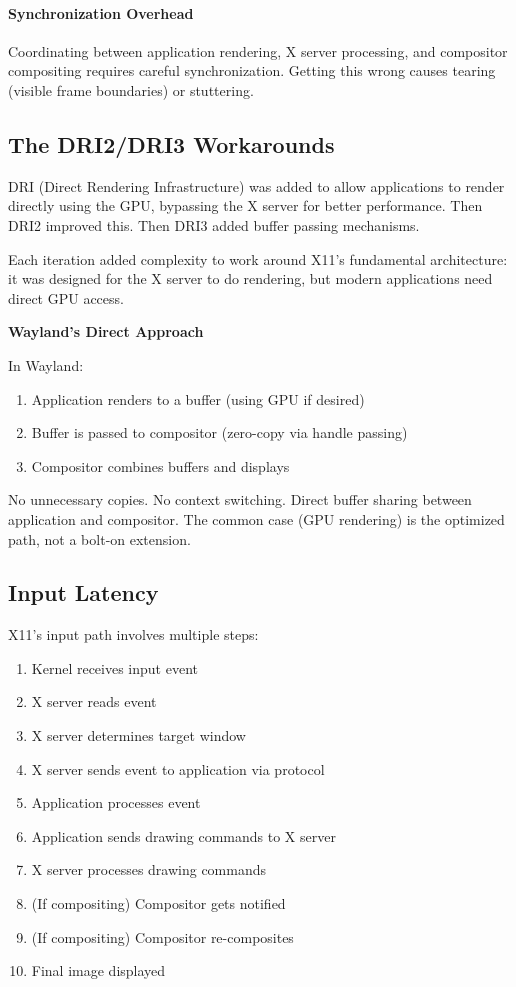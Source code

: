\paragraph{Synchronization Overhead}
Coordinating between application rendering, X server processing, and compositor compositing requires careful synchronization. Getting this wrong causes tearing (visible frame boundaries) or stuttering.

\subsection{The DRI2/DRI3 Workarounds}

DRI (Direct Rendering Infrastructure) was added to allow applications to render directly using the GPU, bypassing the X server for better performance. Then DRI2 improved this. Then DRI3 added buffer passing mechanisms.

Each iteration added complexity to work around X11's fundamental architecture: it was designed for the X server to do rendering, but modern applications need direct GPU access.

\begin{designbox}
\textbf{Wayland's Direct Approach}

In Wayland:
\begin{enumerate}
    \item Application renders to a buffer (using GPU if desired)
    \item Buffer is passed to compositor (zero-copy via handle passing)
    \item Compositor combines buffers and displays
\end{enumerate}

No unnecessary copies. No context switching. Direct buffer sharing between application and compositor. The common case (GPU rendering) is the optimized path, not a bolt-on extension.
\end{designbox}

\subsection{Input Latency}

X11's input path involves multiple steps:

\begin{enumerate}
    \item Kernel receives input event
    \item X server reads event
    \item X server determines target window
    \item X server sends event to application via protocol
    \item Application processes event
    \item Application sends drawing commands to X server
    \item X server processes drawing commands
    \item (If compositing) Compositor gets notified
    \item (If compositing) Compositor re-composites
    \item Final image displayed
\end{enumerate}

